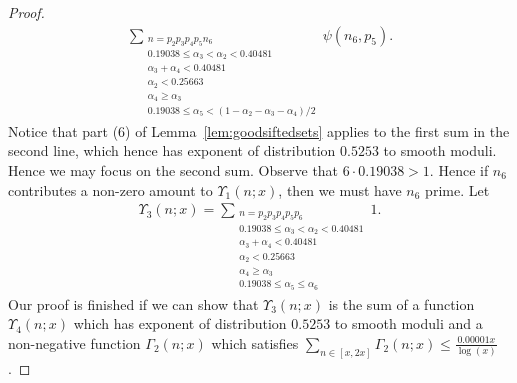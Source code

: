 \documentclass{amsart}
\numberwithin{equation}{section}
\begin{document}
\begin{proof}
\begin{align*}
 \sum_{\substack{ n = p_2p_3p_4p_5n_6 \\ 0.19038 \leq \alpha_3 <\alpha_2 < 0.40481 \\ \alpha_3+\alpha_4 < 0.40481 \\ \alpha_2 < 0.25663 \\ \alpha_4 \geq \alpha_3 \\ 0.19038 \leq \alpha_5 < (1-\alpha_2-\alpha_3-\alpha_4 )/2}} \psi(n_6,p_5). 
\end{align*}
Notice that part (6) of Lemma~\ref{lem:goodsiftedsets} applies to the first sum in the second line, which hence has exponent of distribution $0.5253$ to smooth moduli. Hence we may focus on the second sum. Observe that $6 \cdot 0.19038>1$. Hence if $n_6$ contributes a non-zero amount to $\Upsilon_1(n;x)$, then we must have $n_6$ prime. Let 
\begin{align*}
\Upsilon_3(n;x) = \sum_{\substack{ n = p_2p_3p_4p_5p_6 \\ 0.19038 \leq \alpha_3 <\alpha_2 < 0.40481 \\ \alpha_3+\alpha_4 < 0.40481 \\ \alpha_2 < 0.25663 \\ \alpha_4 \geq \alpha_3 \\ 0.19038 \leq \alpha_5 \leq \alpha_6}} 1. 
\end{align*} 
Our proof is finished if we can show that $\Upsilon_3(n;x)$ is the sum of a function $\Upsilon_4(n;x)$ which has exponent of distribution $0.5253$  to smooth moduli and a non-negative function $\Gamma_2(n;x)$ which satisfies $\sum_{n \in [x,2x]} \Gamma_2(n;x) \leq \frac{0.00001 x}{\log(x)}$. 


\end{proof}
\end{document}
